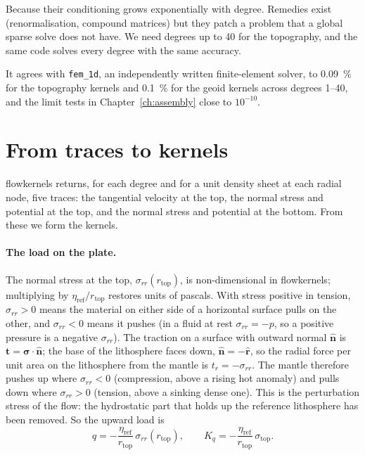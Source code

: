 \begin{defence}
\A Because their conditioning grows exponentially with degree.
Remedies exist (renormalisation, compound matrices) but they patch a problem that a global sparse solve does not have.
We need degrees up to 40 for the topography, and the same code solves every degree with the same accuracy.

\A It agrees with \texttt{fem\_1d}, an independently written finite-element solver, to \qty{0.09}{\percent} for the topography kernels and \qty{0.1}{\percent} for the geoid kernels across degrees 1--40, and the limit tests in Chapter~\ref{ch:assembly} close to $10^{-10}$.
\end{defence}

\section{From traces to kernels}

flowkernels returns, for each degree and for a unit density sheet at each radial node, five traces: the tangential velocity at the top, the normal stress and potential at the top, and the normal stress and potential at the bottom.
From these we form the kernels.

\paragraph{The load on the plate.}
The normal stress at the top, $\sigma_{rr}(r_{\mathrm{top}})$, is non-dimensional in flowkernels; multiplying by $\eta_{\mathrm{ref}}/r_{\mathrm{top}}$ restores units of pascals.
With stress positive in tension, $\sigma_{rr}>0$ means the material on either side of a horizontal surface pulls on the other, and $\sigma_{rr}<0$ means it pushes (in a fluid at rest $\sigma_{rr}=-p$, so a positive pressure is a negative $\sigma_{rr}$).
The traction on a surface with outward normal $\hat{\bm n}$ is $\bm t = \bm\sigma\cdot\hat{\bm n}$; the base of the lithosphere faces down, $\hat{\bm n} = -\hat{\bm r}$, so the radial force per unit area on the lithosphere from the mantle is $t_r = -\sigma_{rr}$.
The mantle therefore pushes up where $\sigma_{rr}<0$ (compression, above a rising hot anomaly) and pulls down where $\sigma_{rr}>0$ (tension, above a sinking dense one).
This is the perturbation stress of the flow: the hydrostatic part that holds up the reference lithosphere has been removed.
So the upward load is
\begin{equation}
    q = -\frac{\eta_{\mathrm{ref}}}{r_{\mathrm{top}}}\,\sigma_{rr}(r_{\mathrm{top}}),
    \qquad K_q = -\frac{\eta_{\mathrm{ref}}}{r_{\mathrm{top}}}\,\sigma_{\mathrm{top}} .
\end{equation}

